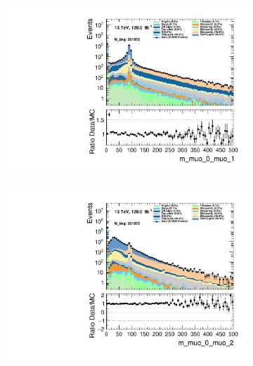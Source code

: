 \begin{figure}
\begin{subfigure}{.49\textwidth}
        \includegraphics[width=\textwidth]{Figures/MC_Data_comp/m_muo_0_muo_1.pdf}
        \caption{ }
        \label{fig:fep}
    \end{subfigure}
    \hfill
    \begin{subfigure}{.49\textwidth}
        \includegraphics[width=\textwidth]{Figures/MC_Data_comp/m_muo_0_muo_2.pdf}
        \caption{ }
        \label{fig:fe}
    \end{subfigure}
    \hfill       
    \caption{}
    \label{fig:t}
\end{figure}

